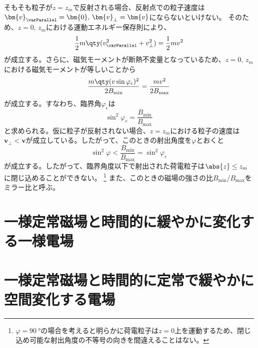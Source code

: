 そもそも粒子が$z=z_m$で反射される場合、反射点での粒子速度は$\bm{v}_{\varParallel} = \bm{0},\,\bm{v}_{\perp} = \bm{v}$にならないといけない。
そのため、$z=0,\,z_m$における運動エネルギー保存則により、
\begin{equation}
	\frac{1}{2}m\qty( v_{\varParallel}^2 + v^2_{\perp}) = \frac{1}{2}mv^2
\end{equation}
が成立する。さらに、磁気モーメントが断熱不変量となっているため、$z=0,\,z_m$における磁気モーメントが等しいことから
\begin{equation}
	\frac{m\qty(v\sin\varphi_c)^2}{2B_{\text{min}}} = \frac{mv^2}{2B_{\text{max}}}
\end{equation}
が成立する。すなわち、臨界角$\varphi_c$は
\begin{equation}
	\sin^2\varphi_c = \frac{B_{\text{min}}}{B_{\text{max}}}
\end{equation}
と求められる。仮に粒子が反射されない場合、$z=z_m$における粒子の速度は$\bm{v}_{\perp} < \bm{v}$が成立している。したがって、このときの射出角度を$\varphi$とおくと
\begin{equation}
	\sin^2\varphi < \frac{B_{\text{min}}}{B_{\text{max}}} = \sin^2\varphi_c
\end{equation}
が成立する。したがって、臨界角度以下で射出された荷電粒子は$\abs{z} \leq z_m$に閉じ込めることができない。
\footnote{$\varphi = \SI{90}{\degree}$の場合を考えると明らかに荷電粒子は$z=0$上を運動するため、閉じ込め可能な射出角度の不等号の向きを間違えることはない。}
また、このときの磁場の強さの比$B_{\text{min}}/B_{\text{max}}$をミラー比と呼ぶ。


\section{一様定常磁場と時間的に緩やかに変化する一様電場}



\section{一様定常磁場と時間的に定常で緩やかに空間変化する電場}

